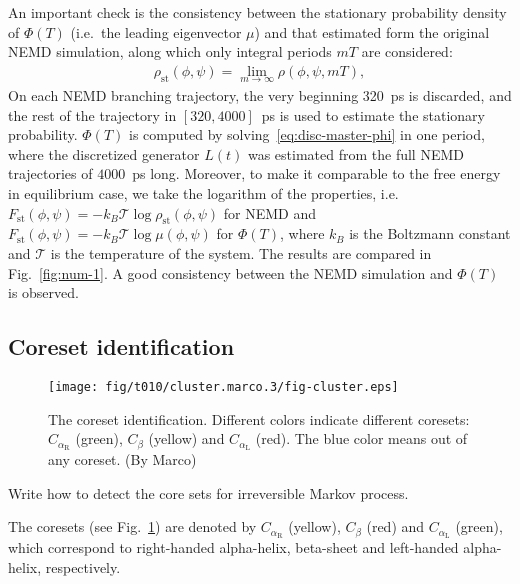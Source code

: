 \documentclass[aps, pre, preprint,unsortedaddress,a4paper,onecolumn]{revtex4}
\newcommand{\redc}[1]{{\color{red} #1}}
\newcommand{\confaa}[0]{{\alpha_{\textrm{R}}}}
\newcommand{\confc}[0]{{\alpha_{\textrm{L}}}}
\begin{document}
An important check is the consistency between the
stationary probability density of $\Phi(T)$ (i.e.~the leading eigenvector $\mu$) and that 
estimated form the original NEMD simulation, along which only integral periods $mT$ are considered:
\begin{align}
  \label{eq:num-tmp1}
  \rho_{\textrm{st}}(\phi,\psi) = \lim_{m\rightarrow\infty} \rho (\phi,\psi,mT),
\end{align}
On each NEMD branching trajectory, the very beginning 320~ps is discarded, and
the rest of the trajectory in $[320,4000]$~ps is used to estimate
the stationary probability. $\Phi(T)$ is computed by solving~\eqref{eq:disc-master-phi}
in one period, where the discretized generator $L(t)$ was estimated
from the full NEMD trajectories of $4000$~ps long.
Moreover, to make it comparable to the free energy in equilibrium case, we take
the logarithm of the properties, i.e.~$F_{\textrm{st}}(\phi,\psi)=
-k_B\mathcal T\log \rho_{\textrm{st}}(\phi,\psi)$
for NEMD and $F_{\textrm{st}}(\phi,\psi)=
-k_B\mathcal T\log \mu(\phi,\psi)$ for $\Phi(T)$, where $k_B$ is the
Boltzmann constant and $\mathcal T$ is the temperature of the system.
The
results are  compared in Fig.~\ref{fig:num-1}. A good consistency between
the  NEMD simulation and 
$\Phi(T)$ is observed.  

\subsection{Coreset identification}

\begin{figure}
  \centering
  \texttt{[image: fig/t010/cluster.marco.3/fig-cluster.eps]}
  \caption{The coreset identification. Different colors indicate different coresets: $C_{\confaa}$ (green), $C_\beta$ (yellow) and $C_{\confc}$ (red).
    The blue color means out of any coreset. (By Marco)}
  \label{fig:cluster}
\end{figure}

\redc{Write how to detect the core sets for irreversible Markov process}.

The coresets (see Fig.~\ref{fig:cluster}) are denoted by $C_{\confaa}$ (yellow), $C_\beta$ (red) and $C_{\confc}$ (green), which correspond to
right-handed alpha-helix, beta-sheet and left-handed alpha-helix, respectively.
\end{document}
